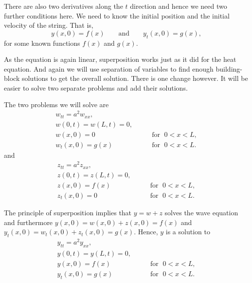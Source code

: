 \documentclass[12pt]{book}
\begin{document}
There are also two derivatives along the $t$ direction and hence we need
two further conditions here.  We need to know the initial position
and the initial velocity of the string.  That is,
\begin{equation*}
y(x,0) = f(x)  \qquad \text{and} \qquad y_t (x,0) =
g(x) ,
\end{equation*}
for some known functions $f(x)$ and $g(x)$.

As the equation is again linear, superposition works just as it did for the
heat equation.  And again we will use separation of variables to find
enough building-block solutions to get the overall solution.  There is
one change however.  It will be easier to solve two separate problems
and add their solutions.

The two problems we will solve are
\begin{equation} \label{wave:weq}
\begin{array}{ll}
w_{tt} = a^2 w_{xx} , &  \\
w(0,t) = w(L,t) = 0 , &  \\
w(x,0) = 0 & \qquad \text{for } \; 0 < x < L , \\
w_t(x,0) = g(x) & \qquad \text{for } \; 0 < x < L .
\end{array}
\end{equation}
and
\begin{equation} \label{wave:zeq}
\begin{array}{ll}
z_{tt} = a^2 z_{xx} , &  \\
z(0,t) = z(L,t) = 0 , &  \\
z(x,0) = f(x) & \qquad \text{for } \; 0 < x < L , \\
z_t(x,0) = 0 & \qquad \text{for } \; 0 < x < L .
\end{array}
\end{equation}

The principle of superposition implies that
$y = w + z$ solves the wave equation and furthermore
$y(x,0) = w(x,0) + z(x,0) = f(x)$ and
$y_t(x,0) = w_t(x,0) + z_t(x,0) = g(x)$.  Hence, $y$ is
a solution to
\begin{equation} \label{wave:yeq}
\begin{array}{ll}
y_{tt} = a^2 y_{xx} , &  \\
y(0,t) = y(L,t) = 0 , &  \\
y(x,0) = f(x) & \qquad \text{for } \; 0 < x < L , \\
y_t(x,0) = g(x) & \qquad \text{for } \; 0 < x < L .
\end{array}
\end{equation}
\end{document}
